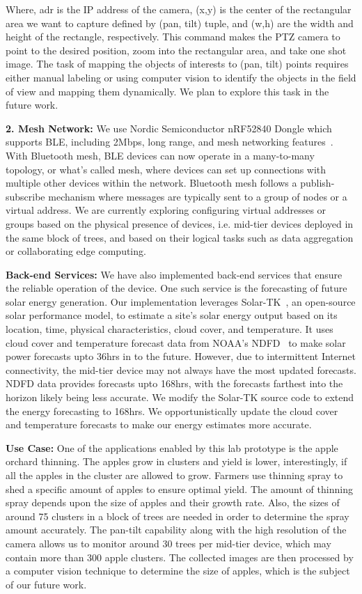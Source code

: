 Where, adr is the IP address of the camera, (x,y) is the center of the rectangular area we want to capture defined by (pan, tilt) tuple, and (w,h) are the width and height of the rectangle, respectively. This command makes the PTZ camera to point to the desired position, zoom into the rectangular area, and take one shot image. 
The task of mapping the objects of interests to (pan, tilt) points requires either manual labeling or using computer vision to identify the objects in the field of view and mapping them dynamically. We plan to explore this task in the future work. 

\noindent
\textbf{2. Mesh Network:} We use Nordic Semiconductor nRF52840 Dongle which supports BLE, including 2Mbps, long range, and mesh networking features~\cite{nrf52840}. 
With Bluetooth mesh, BLE devices can now operate in a many-to-many topology, or what's called mesh, where devices can set up connections with multiple other devices within the network. Bluetooth mesh follows a publish-subscribe mechanism where messages are typically sent to a group of nodes or a virtual address. We are currently exploring configuring virtual addresses or groups based on the physical presence of devices, i.e. mid-tier devices deployed in the same block of trees, and based on their logical tasks such as data aggregation or collaborating edge computing.

\noindent
\textbf{Back-end Services: }
We have also implemented back-end services that ensure the reliable operation of the device. One such service is the forecasting of future solar energy generation. Our implementation leverages Solar-TK~\cite{bashir2019solar}, an open-source solar performance model, to estimate a site’s solar energy output based on its location, time, physical characteristics, cloud cover, and temperature. It uses cloud cover and temperature forecast data from NOAA's NDFD~\cite{ndfd} to make solar power forecasts upto 36hrs in to the future. However, due to intermittent Internet connectivity, the mid-tier device may not always have the most updated forecasts. NDFD data provides forecasts upto 168hrs, with the forecasts farthest into the horizon likely being less accurate. We modify the Solar-TK source code to extend the energy forecasting to 168hrs. We opportunistically update the cloud cover and temperature forecasts to make our energy estimates more accurate. 

\noindent
\textbf{Use Case:} One of the applications enabled by this lab prototype is the apple orchard thinning. The apples grow in clusters and yield is lower, interestingly, if all the apples in the cluster are allowed to grow. Farmers use thinning spray to shed a specific amount of apples to ensure optimal yield. The amount of thinning spray depends upon the size of apples and their growth rate. Also, the sizes of around 75 clusters in a block of trees are needed in order to determine the spray amount accurately. 
The pan-tilt capability along with the high resolution of the camera allows us to monitor around 30 trees per mid-tier device, which may contain more than 300 apple clusters. The collected images are then processed by a computer vision technique to determine the size of apples, which is the subject of our future work. 

